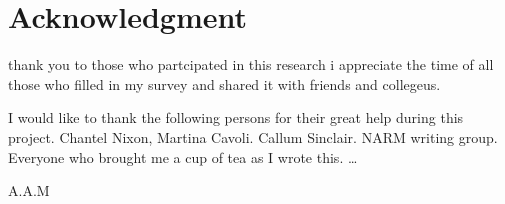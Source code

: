 \section*{Acknowledgment}
thank you to those who partcipated in this research i appreciate the time of all those who filled in my survey and shared it with friends and collegeus.

I would like to thank the following persons for their great help during this project. Chantel Nixon, Martina Cavoli. Callum Sinclair. NARM writing group. Everyone who brought me a cup of tea as I wrote this. \ldots



\begin{flushright}
A.A.M\\[1pc]

\end{flushright}
